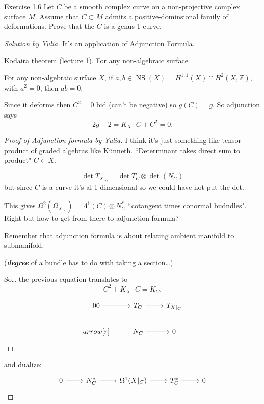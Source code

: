 \begin{thing4}{Exercise 1.6}\label{exer:1.6}\leavevmode
Let $C$ be a smooth complex curve on a non-projective complex surface \(M\). Assume that \(C \subset M\) admits a positive-dominsional family of deformations. Prove that the $C$ is a genus 1 curve.
\end{thing4}

\begin{proof}[Solution by Yulia]\leavevmode
It's an application of Adjunction Formula.

\begin{remark}\leavevmode
Kodaira theorem (lecture 1). For any non-algebraic surface
\end{remark}
\begin{thm}[Kodaira]\leavevmode
For any non-algebraic surface \(X\), if \(a,b \in \operatorname{NS}(X)= H^{1,1}(X)\cap H^{2}(X,\mathbb{Z})\), with \(a^2=0\), then \(ab=0\).
\end{thm}

Since it deforms  then \(C^2=0\) bid (can't be negative) so \(g(C)=g\). So adjunction says
 \[2g-2=K_X\cdot C+ C^2=0.\]

\begin{proof}[Proof of Adjunction formula by Yulia]\leavevmode
{\color{6}I think it's just something like tensor product of graded algebras like Künneth. ``Determinant takes direct sum to product"} \(C \subset X\).

\[\det T_{X|_{C}}=\det T_C \otimes \det (N_C)\]
but since $C$ is a curve it's al 1 dimensional so we could have not put the det.

This gives \(\Omega^{2}(\Omega_{X|_{C}})=\Lambda^{1}(C) \otimes N^*_C\)
``cotangent times conormal budndles". Right but how to get from there to adjunction formula?

Remember that adjunction formula is about relating ambient manifold to submanifold.

(\textit{\textbf{degree}} of a bundle has to do with taking a section…)

So… the previous equation translates to
\[C^2 + K_X \cdot C = K_C.\]





\[\begin{tikzcd}0\arrow[r]0&T_C\arrow[r]&T_{X|_{C}}\\arrow[r]&N_C\arrow[r]&0\end{tikzcd}\]
\end{proof}
and dualize:
\[\begin{tikzcd}0\arrow[r]&N_C^*\arrow[r]&\Omega^{1}(X|_{C})\arrow[r]&T^*_C\arrow[r]&0\end{tikzcd}\]
\end{proof}



